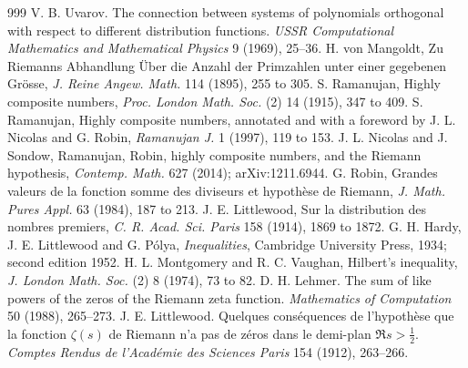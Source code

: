 \begin{thebibliography}{999}
 V. B. Uvarov. The connection between systems of polynomials orthogonal with respect to different distribution functions. \emph{USSR Computational Mathematics and Mathematical Physics} 9 (1969), 25--36.
 H. von Mangoldt, Zu Riemanns Abhandlung \"Uber die Anzahl der Primzahlen unter einer gegebenen Gr\"osse, \emph{J. Reine Angew. Math.} 114 (1895), 255 to 305.
 S. Ramanujan, Highly composite numbers, \emph{Proc. London Math. Soc.} (2) 14 (1915), 347 to 409.
 S. Ramanujan, Highly composite numbers, annotated and with a foreword by J. L. Nicolas and G. Robin, \emph{Ramanujan J.} 1 (1997), 119 to 153.
 J. L. Nicolas and J. Sondow, Ramanujan, Robin, highly composite numbers, and the Riemann hypothesis, \emph{Contemp. Math.} 627 (2014); arXiv:1211.6944.
 G. Robin, Grandes valeurs de la fonction somme des diviseurs et hypoth\`ese de Riemann, \emph{J. Math. Pures Appl.} 63 (1984), 187 to 213.
 J. E. Littlewood, Sur la distribution des nombres premiers, \emph{C. R. Acad. Sci. Paris} 158 (1914), 1869 to 1872.
 G. H. Hardy, J. E. Littlewood and G. P\'olya, \emph{Inequalities}, Cambridge University Press, 1934; second edition 1952.
 H. L. Montgomery and R. C. Vaughan, Hilbert's inequality, \emph{J. London Math. Soc.} (2) 8 (1974), 73 to 82.
 D. H. Lehmer. The sum of like powers of the zeros of the Riemann zeta function. \emph{Mathematics of Computation} 50 (1988), 265--273.
 J. E. Littlewood. Quelques cons\'equences de l'hypoth\`ese que la fonction $\zeta(s)$ de Riemann n'a pas de z\'eros dans le demi-plan $\Re s>\frac12$. \emph{Comptes Rendus de l'Acad\'emie des Sciences Paris} 154 (1912), 263--266.


\end{thebibliography}
